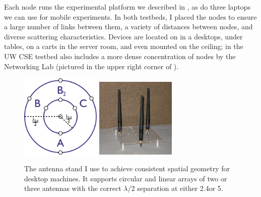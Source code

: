 Each node runs the experimental platform we described in , as do three laptops we can use for mobile experiments. In both testbeds, I placed the nodes to ensure a large number of links between them, a variety of distances between nodes, and diverse scattering characteristics. Devices are located on in a desktops, under tables, on a carts in the server room, and even mounted on the ceiling; in the UW CSE testbed also includes a more dense concentration of nodes by the Networking Lab (pictured in the upper right corner of ).

\begin{figure}[ht]
	\centering
	\includegraphics[width=1.5in]{figures/rpsma_dual_632_single_lines.pdf}%
	\hspace{1in}
	\includegraphics[height=1.5in,width=1.5in]{figures/antennas.png}
	\caption[A custom antenna stand used to achieve consistent spatial geometry]{\label{fig:antenna_stand}The antenna stand I use to achieve consistent spatial geometry for desktop machines. It supports circular and linear arrays of two or three antennas with the correct $\lambda/2$ separation at either 2.4\GHz or 5\GHz.}
\end{figure}
